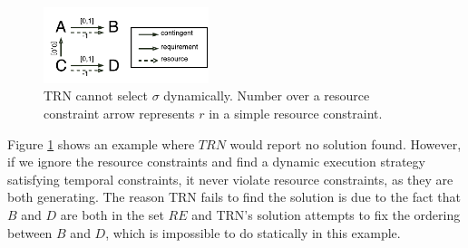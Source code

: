 \begin{figure}[H]
\begin{center}
\includegraphics[width=0.43\textwidth,trim={0.23cm 0.23cm 0.00cm 0.37cm},clip]{stnu_counter}
\caption{TRN cannot select $\sigma$ dynamically. Number over a resource constraint arrow represents $r$ in a simple resource constraint.}
\label{fig:stnu_counter}
\end{center}
\end{figure}

Figure \ref{fig:stnu_counter} shows an example where $TRN$ would report no solution found. However, if we ignore the resource constraints and find a dynamic execution strategy satisfying temporal constraints, it never violate resource constraints, as they are both generating. The reason TRN fails to find the solution is due to the fact that $B$ and $D$ are both in the set $RE$ and TRN's solution attempts to fix the ordering between $B$ and $D$, which is impossible to do statically in this example.



